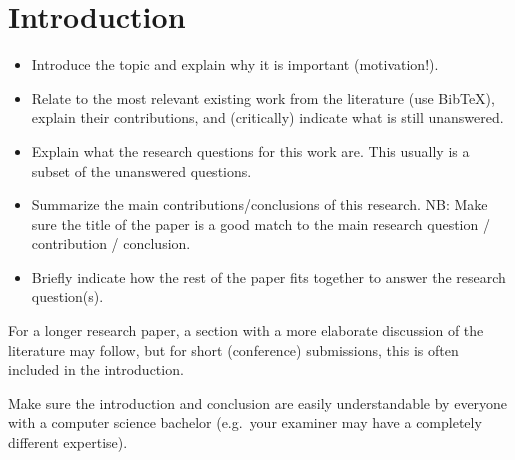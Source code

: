 \section{Introduction}
\begin{itemize}
\item Introduce the topic and explain why it is important (motivation!). %

\item Relate to the most relevant existing work from the literature (use BibTeX), explain their contributions, and (critically) indicate what is still unanswered. 

\item Explain what the research questions for this work are. 
This usually is a subset of the unanswered questions. %

\item Summarize the main contributions/conclusions of this research.
NB: Make sure the title of the paper is a good match to the main research question / contribution / conclusion.

\item Briefly indicate how the rest of the paper fits together to answer the research question(s).
\end{itemize}

For a longer research paper, a section with a more elaborate discussion of the literature may follow, but for short (conference) submissions, this is often included in the introduction.

Make sure the introduction and conclusion are easily understandable by everyone with a computer science bachelor (e.g.\ your examiner may have a completely different expertise).
